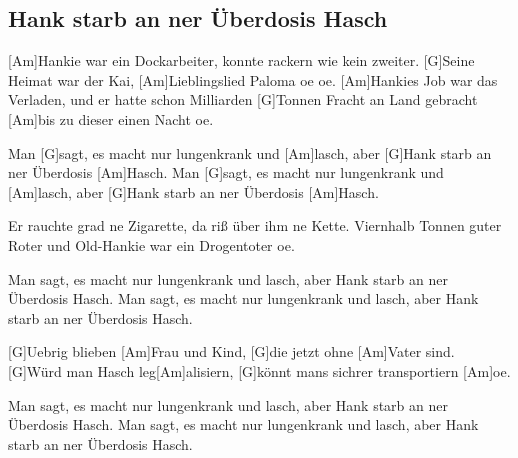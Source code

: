 \subsection*{Hank starb an ner Überdosis Hasch   }
\begin{guitar}

[Am]Hankie war ein Dockarbeiter, konnte rackern wie kein zweiter. 
[G]Seine Heimat war der Kai, [Am]Lieblingslied Paloma oe oe. 
[Am]Hankies Job war das Verladen, und er hatte schon Milliarden 
[G]Tonnen Fracht an Land gebracht [Am]bis zu dieser einen Nacht oe.


Man [G]sagt, es macht nur lungenkrank und [Am]lasch, 
aber [G]Hank starb an ner Überdosis [Am]Hasch. 
Man [G]sagt, es macht nur lungenkrank und [Am]lasch, 
aber [G]Hank starb an ner Überdosis [Am]Hasch.


Er rauchte grad ne Zigarette, da riß über ihm ne Kette. 
Viernhalb Tonnen guter Roter und Old-Hankie war ein Drogentoter oe. 


Man sagt, es macht nur lungenkrank und lasch, 
aber Hank starb an ner Überdosis Hasch. 
Man sagt, es macht nur lungenkrank und lasch, 
aber Hank starb an ner Überdosis Hasch. 


[G]Uebrig blieben [Am]Frau und Kind, [G]die jetzt ohne [Am]Vater sind. 
[G]Würd man Hasch leg[Am]alisiern, [G]könnt mans sichrer transportiern [Am]oe.

Man sagt, es macht nur lungenkrank und lasch, 
aber Hank starb an ner Überdosis Hasch. 
Man sagt, es macht nur lungenkrank und lasch, 
aber Hank starb an ner Überdosis Hasch. 

\end{guitar}
